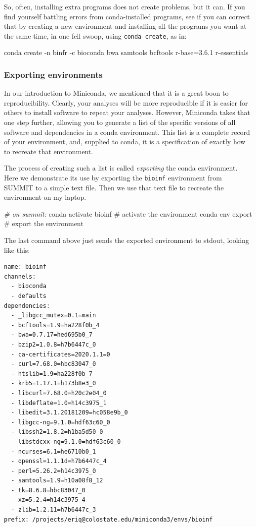 \documentclass[]{krantz}
\makeatletter
\newenvironment{Shaded}{\begin{snugshade}}{\end{snugshade}}
\newcommand{\CommentTok}[1]{\textcolor[rgb]{0.37,0.37,0.37}{\textit{#1}}}
\newcommand{\ExtensionTok}[1]{#1}
\newcommand{\NormalTok}[1]{#1}
\newenvironment{kframe}{%
\medskip{}
\setlength{\fboxsep}{.8em}
 \def\at@end@of@kframe{}%
 \ifinner\ifhmode%
  \def\at@end@of@kframe{\end{minipage}}%
  \begin{minipage}{\columnwidth}%
 \fi\fi%
 \def\FrameCommand##1{\hskip\@totalleftmargin \hskip-\fboxsep
 \colorbox{shadecolor}{##1}\hskip-\fboxsep
     \hskip-\linewidth \hskip-\@totalleftmargin \hskip\columnwidth}%
 \MakeFramed {\advance\hsize-\width
   \@totalleftmargin\z@ \linewidth\hsize
   \@setminipage}}%
 {\par\unskip\endMakeFramed%
 \at@end@of@kframe}
\renewenvironment{Shaded}{\begin{kframe}}{\end{kframe}}
\makeatother
\begin{document}
So, often, installing extra programs does not create problems, but it can. If you find yourself battling
errors from conda-installed programs, see if you can correct that by creating a new environment and installing all the programs
you want at the same time, in one fell swoop, using \texttt{conda\ create}, as in:

\begin{Shaded}
\begin{Highlighting}[]
\ExtensionTok{conda}\NormalTok{ create -n binfr -c bioconda bwa samtools bcftools r-base=3.6.1 r-essentials}
\end{Highlighting}
\end{Shaded}

\hypertarget{exporting-environments}{%
\subsubsection{Exporting environments}\label{exporting-environments}}

In our introduction to Miniconda, we mentioned that it is a great boon to
reproducibility. Clearly, your analyses will be more reproducible if it is
easier for others to install software to repeat your analyses. However, Miniconda
takes that one step further, allowing you to generate a list of
the specific versions of
all software and dependencies in a conda environment. This list is a complete
record of your environment, and, supplied to conda, it is a specification of
exactly how to recreate that environment.

The process of creating such a list is called \emph{exporting} the conda
environment. Here we demonstrate its use by exporting the \texttt{bioinf}
environment from SUMMIT to a simple text file. Then we use that text file
to recreate the environment on my laptop.

\begin{Shaded}
\begin{Highlighting}[]
\CommentTok{# on summit:}
\ExtensionTok{conda}\NormalTok{ activate bioinf          # activate the environment}
\ExtensionTok{conda}\NormalTok{ env export               # export the environment}
\end{Highlighting}
\end{Shaded}

The last command above just sends the exported environment
to stdout, looking like this:

\begin{verbatim}
name: bioinf
channels:
  - bioconda
  - defaults
dependencies:
  - _libgcc_mutex=0.1=main
  - bcftools=1.9=ha228f0b_4
  - bwa=0.7.17=hed695b0_7
  - bzip2=1.0.8=h7b6447c_0
  - ca-certificates=2020.1.1=0
  - curl=7.68.0=hbc83047_0
  - htslib=1.9=ha228f0b_7
  - krb5=1.17.1=h173b8e3_0
  - libcurl=7.68.0=h20c2e04_0
  - libdeflate=1.0=h14c3975_1
  - libedit=3.1.20181209=hc058e9b_0
  - libgcc-ng=9.1.0=hdf63c60_0
  - libssh2=1.8.2=h1ba5d50_0
  - libstdcxx-ng=9.1.0=hdf63c60_0
  - ncurses=6.1=he6710b0_1
  - openssl=1.1.1d=h7b6447c_4
  - perl=5.26.2=h14c3975_0
  - samtools=1.9=h10a08f8_12
  - tk=8.6.8=hbc83047_0
  - xz=5.2.4=h14c3975_4
  - zlib=1.2.11=h7b6447c_3
prefix: /projects/eriq@colostate.edu/miniconda3/envs/bioinf
\end{verbatim}
\end{document}

